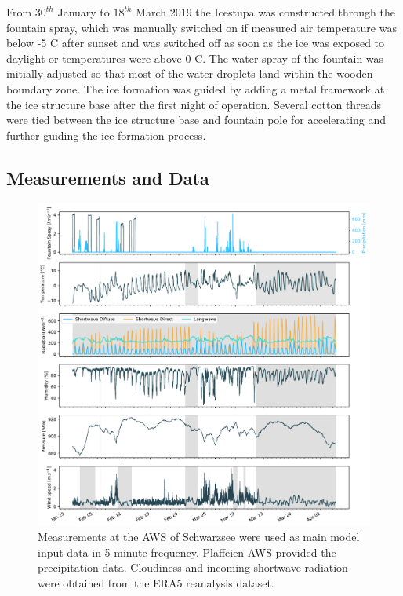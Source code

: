 \documentclass[utf8]{frontiersSCNS} %
\begin{document}
From $30^{th}$ January to $18^{th}$ March 2019 the Icestupa was constructed through the fountain spray, which was
manually switched on if measured air temperature was below -5 \degree C after sunset and was switched off as soon as
the ice was exposed to daylight or temperatures were above 0 \degree C. The water spray of the fountain was initially
adjusted so that most of the water droplets land within the wooden boundary zone. The ice formation was guided by
adding a metal framework at the ice structure base after the first night of operation. Several cotton threads were
tied between the ice structure base and fountain pole for accelerating and further guiding the ice formation process. 

\subsection{Measurements and Data}

\begin{figure}[htpb] \centering \includegraphics[width=\linewidth]{./Figures/Figure_3} \caption{Measurements at the AWS
of Schwarzsee were used as main model input data in 5 minute frequency. Plaffeien AWS provided the precipitation data.
Cloudiness and incoming shortwave radiation were obtained from the ERA5 reanalysis dataset.} \label{fig:input}
\end{figure}
\end{document}
